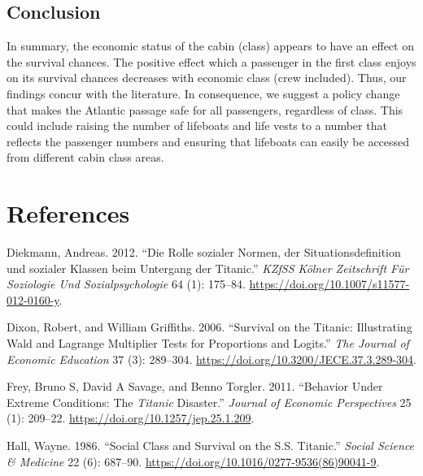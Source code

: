 \documentclass[
]{article}
\begin{document}
\hypertarget{conclusion}{%
\subsection{Conclusion}\label{conclusion}}

In summary, the economic status of the cabin (class) appears to have an
effect on the survival chances. The positive effect which a passenger in
the first class enjoys on its survival chances decreases with economic
class (crew included). Thus, our findings concur with the literature. In
consequence, we suggest a policy change that makes the Atlantic passage
safe for all passengers, regardless of class. This could include raising
the number of lifeboats and life vests to a number that reflects the
passenger numbers and ensuring that lifeboats can easily be accessed
from different cabin class areas.

\hypertarget{references}{%
\section{References}\label{references}}

\hypertarget{refs}{}
\leavevmode\hypertarget{ref-diekmann2012}{}%
Diekmann, Andreas. 2012. ``Die Rolle sozialer Normen, der
Situationsdefinition und sozialer Klassen beim Untergang der Titanic.''
\emph{KZfSS Kölner Zeitschrift Für Soziologie Und Sozialpsychologie} 64
(1): 175--84. \url{https://doi.org/10.1007/s11577-012-0160-y}.

\leavevmode\hypertarget{ref-dixon2006}{}%
Dixon, Robert, and William Griffiths. 2006. ``Survival on the Titanic:
Illustrating Wald and Lagrange Multiplier Tests for Proportions and
Logits.'' \emph{The Journal of Economic Education} 37 (3): 289--304.
\url{https://doi.org/10.3200/JECE.37.3.289-304}.

\leavevmode\hypertarget{ref-frey2011}{}%
Frey, Bruno S, David A Savage, and Benno Torgler. 2011. ``Behavior Under
Extreme Conditions: The \emph{Titanic} Disaster.'' \emph{Journal of
Economic Perspectives} 25 (1): 209--22.
\url{https://doi.org/10.1257/jep.25.1.209}.

\leavevmode\hypertarget{ref-hall1986}{}%
Hall, Wayne. 1986. ``Social Class and Survival on the S.S. Titanic.''
\emph{Social Science \& Medicine} 22 (6): 687--90.
\url{https://doi.org/10.1016/0277-9536(86)90041-9}.
\end{document}
